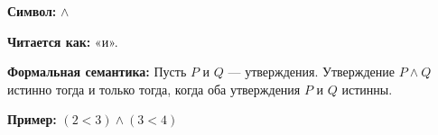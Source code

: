 
\hypertarget{axiom-conjunction}{}
\begin{object} %

\textbf{Символ:} $\land$

\textbf{Читается как:} «и».

\textbf{Формальная семантика:}
Пусть $P$ и $Q$ — утверждения. Утверждение $P \land Q$ истинно тогда и только тогда, когда оба утверждения $P$ и $Q$ истинны.

\textbf{Пример:} $(2 < 3) \land (3 < 4)$
\end{object}